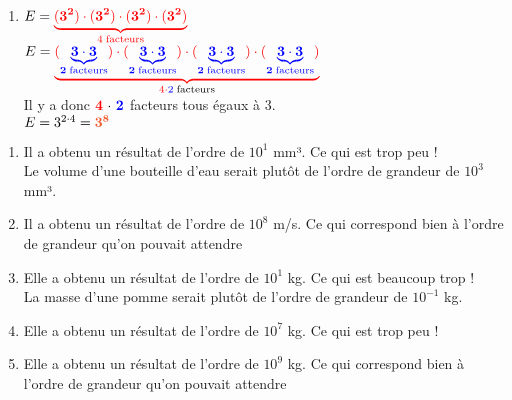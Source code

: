 \documentclass[a4paper,12pt]{report}
\begin{document}
\begin{Correction}
\begin{EXO}{}{}
\begin{enumerate}[]
\item $E=\color{red}{\underbrace{\mathbf{\color{red}{(3^{2})}} \cdot \mathbf{\color{red}{(3^{2})}}\cdot \mathbf{\color{red}{(3^{2})}}\cdot \mathbf{\color{red}{(3^{2})}}}_{4\thickspace\text{facteurs}}}$\\$E=\color{red}{\underbrace{\mathbf{\color{red}{(\color{blue}{\underbrace{\mathbf{\color{blue}{3}} \cdot \mathbf{\color{blue}{3}}}_{2\thickspace\text{facteurs}}}\color{red})}} \cdot \mathbf{\color{red}{(\color{blue}{\underbrace{\mathbf{\color{blue}{3}} \cdot \mathbf{\color{blue}{3}}}_{2\thickspace\text{facteurs}}}\color{red})}}\cdot \mathbf{\color{red}{(\color{blue}{\underbrace{\mathbf{\color{blue}{3}} \cdot \mathbf{\color{blue}{3}}}_{2\thickspace\text{facteurs}}}\color{red})}}\cdot \mathbf{\color{red}{(\color{blue}{\underbrace{\mathbf{\color{blue}{3}} \cdot \mathbf{\color{blue}{3}}}_{2\thickspace\text{facteurs}}}\color{red})}}}_{4\cdot\color{blue}{2}\thickspace\color{black}{\text{facteurs}}}}$\\Il y a donc $\mathbf{\color{red}{4}~\color{black}{\cdot}~\color{blue}{2}}$ facteurs tous égaux à $3$.\\$E=3^{2\cdot4} = {\color[HTML]{f15929}\boldsymbol{3^{8}}}$
\end{enumerate}

\end{EXO}

\begin{EXO}{}{}

\begin{enumerate}[]
\item Il a obtenu un résultat de l'ordre de $10^{1}$ mm³. Ce qui est trop peu !\\Le volume d'une bouteille d'eau serait plutôt de l'ordre de grandeur de $10^{3}$ mm³.
\item Il a obtenu un résultat de l'ordre de $10^{8}$ m/s. Ce qui correspond bien à l'ordre de grandeur qu'on pouvait attendre
\item Elle a obtenu un résultat de l'ordre de $10^{1}$ kg. Ce qui est beaucoup trop !\\La masse d'une pomme serait plutôt de l'ordre de grandeur de $10^{-1}$ kg.
\item Elle a obtenu un résultat de l'ordre de $10^{7}$ kg. Ce qui est trop peu !
\item Elle a obtenu un résultat de l'ordre de $10^{9}$ kg. Ce qui correspond bien à l'ordre de grandeur qu'on pouvait attendre
\end{enumerate}


\end{EXO}
\end{Correction}
\end{document}
